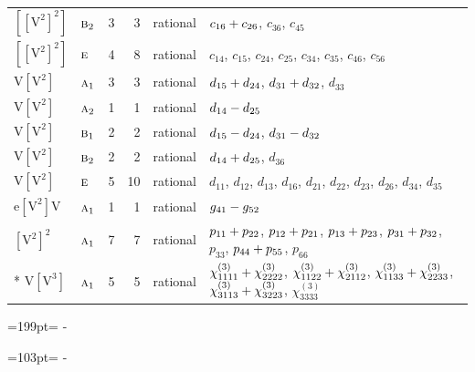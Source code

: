\documentclass[10pt,a4paper]{article}
\newcommand{\needspace}[1]{\par\penalty-100\begingroup\dimen0=#1\relax\dimen2=\pagegoal
  \advance\dimen2-\pagetotal\ifdim\dimen0>\dimen2\relax\ifdim\dimen2>0pt\vfil\break\fi\fi
  \endgroup}
\numberwithin{equation}{section}
\newcommand{\irr}[1]{\text{\normalfont\scshape #1}}
\newcommand{\jahn}[1]{\mathrm{#1}}
\newlength{\fillwidth}\newlength{\cellwidth}\newlength{\colwidth}
\newcommand{\signbreak}{\penalty100\relax}
\begin{document}
{\begin{longtable}{@{}llrrl>{\RaggedRight\arraybackslash}p{\fillwidth}@{}}
$\jahn{[[V^{2}]^{2}]}$ & $\irr{b}_{2}$ & 3 & 3 & rational & $c_{16} +\signbreak c_{26}$, $c_{36}$, $c_{45}$\\
$\jahn{[[V^{2}]^{2}]}$ & $\irr{e}$ & 4 & 8 & rational & $c_{14}$, $c_{15}$, $c_{24}$, $c_{25}$, $c_{34}$, $c_{35}$, $c_{46}$, $c_{56}$\\
$\jahn{V[V^{2}]}$ & $\irr{a}_{1}$ & 3 & 3 & rational & $d_{15} +\signbreak d_{24}$, $d_{31} +\signbreak d_{32}$, $d_{33}$\\
$\jahn{V[V^{2}]}$ & $\irr{a}_{2}$ & 1 & 1 & rational & $d_{14} -\signbreak d_{25}$\\
$\jahn{V[V^{2}]}$ & $\irr{b}_{1}$ & 2 & 2 & rational & $d_{15} -\signbreak d_{24}$, $d_{31} -\signbreak d_{32}$\\
$\jahn{V[V^{2}]}$ & $\irr{b}_{2}$ & 2 & 2 & rational & $d_{14} +\signbreak d_{25}$, $d_{36}$\\
$\jahn{V[V^{2}]}$ & $\irr{e}$ & 5 & 10 & rational & $d_{11}$, $d_{12}$, $d_{13}$, $d_{16}$, $d_{21}$, $d_{22}$, $d_{23}$, $d_{26}$, $d_{34}$, $d_{35}$\\
$\jahn{e[V^{2}]V}$ & $\irr{a}_{1}$ & 1 & 1 & rational & $\mathnormal{g}_{41} -\signbreak \mathnormal{g}_{52}$\\
$\jahn{[V^{2}]^{2}}$ & $\irr{a}_{1}$ & 7 & 7 & rational & $p_{11} +\signbreak p_{22}$, $p_{12} +\signbreak p_{21}$, $p_{13} +\signbreak p_{23}$, $p_{31} +\signbreak p_{32}$, $p_{33}$, $p_{44} +\signbreak p_{55}$, $p_{66}$\\*
$\jahn{V[V^{3}]}$ & $\irr{a}_{1}$ & 5 & 5 & rational & $\chi^{(3)}_{1111} +\signbreak \chi^{(3)}_{2222}$, $\chi^{(3)}_{1122} +\signbreak \chi^{(3)}_{2112}$, $\chi^{(3)}_{1133} +\signbreak \chi^{(3)}_{2233}$, $\chi^{(3)}_{3113} +\signbreak \chi^{(3)}_{3223}$, $\chi^{(3)}_{3333}$\\
\bottomrule\end{longtable}}
\needspace{199pt}
\needspace{103pt}
\end{document}
